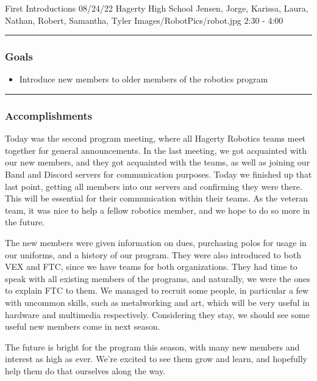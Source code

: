 \insertmeeting 
	{First Introductions} 
	{08/24/22}
	{Hagerty High School}
	{Jensen, Jorge, Karissa, Laura, Nathan, Robert, Samantha, Tyler}
	{Images/RobotPics/robot.jpg}
	{2:30 - 4:00}
	
\noindent\hfil\rule{\textwidth}{.4pt}\hfil
\subsubsection*{Goals}
\begin{itemize}
    \item Introduce new members to older members of the robotics program
    
\end{itemize} 

\noindent\hfil\rule{\textwidth}{.4pt}\hfil

\subsubsection*{Accomplishments}
Today was the second program meeting, where all Hagerty Robotics teams meet together for general announcements. In the last meeting, we got acquainted with our new members, and they got acquainted with the teams, as well as joining our Band and Discord servers for communication purposes. Today we finished up that last point, getting all members into our servers and confirming they were there. This will be essential for their communication within their teams. As the veteran team, it was nice to help a fellow robotics member, and we hope to do so more in the future.

The new members were given information on dues, purchasing polos for usage in our uniforms, and a history of our program. They were also introduced to both VEX and FTC, since we have teams for both organizations. They had time to speak with all existing members of the programs, and naturally, we were the ones to explain FTC to them. We managed to recruit some people, in particular a few with uncommon skills, such as metalworking and art, which will be very useful in hardware and multimedia respectively. Considering they stay, we should see some useful new members come in next season.

The future is bright for the program this season, with many new members and interest as high as ever. We're excited to see them grow and learn, and hopefully help them do that ourselves along the way.





